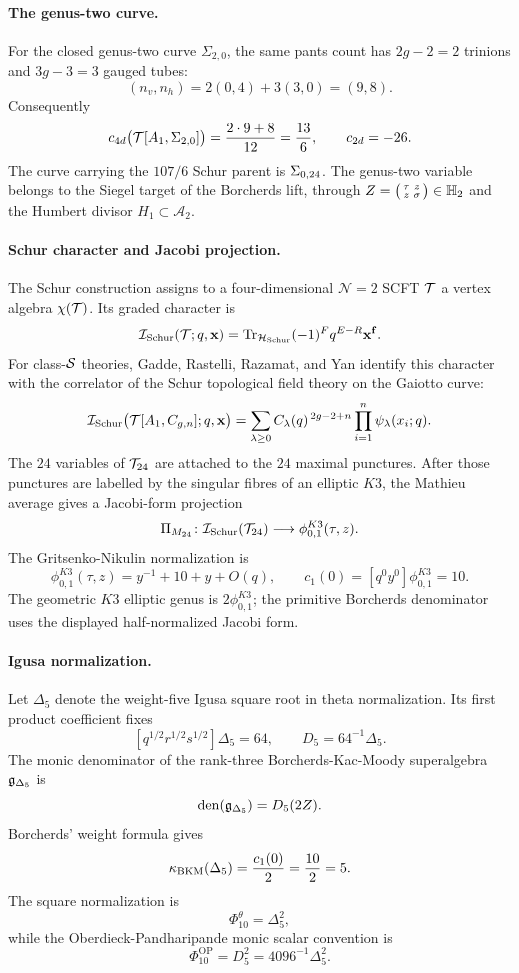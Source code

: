 \paragraph{The genus-two curve.}
For the closed genus-two curve \(\Sigma_{2,0}\), the same pants count
has \(2g-2=2\) trinions and \(3g-3=3\) gauged tubes:
\[
  (n_v,n_h)=2(0,4)+3(3,0)=(9,8).
\]
Consequently
\[
  c_{4d}\bigl(\mathcal{T}[A_1,\Sigma_{2,0}]\bigr)=\frac{2\cdot9+8}{12}
  =\frac{13}{6},
  \qquad
  c_{2d}=-26.
\]
The curve carrying the \(107/6\) Schur parent is \(\Sigma_{0,24}\). The
genus-two variable belongs to the Siegel target of the Borcherds lift,
through \(Z=\bigl(\begin{smallmatrix}\tau&z\\z&\sigma\end{smallmatrix}\bigr)\in\mathbb{H}_2\)
and the Humbert divisor \(H_1\subset\mathcal A_2\).

\paragraph{Schur character and Jacobi projection.}
The Schur construction assigns to a four-dimensional \(\mathcal N=2\)
SCFT \(\mathcal{T}\) a vertex algebra \(\chi(\mathcal{T})\). Its graded character is
\[
  \mathcal{I}_{\mathrm{Schur}}(\mathcal{T};q,\mathbf{x})
  =
  \operatorname{Tr}_{\mathcal H_{\mathrm{Schur}}}
  (-1)^Fq^{E-R}\mathbf{x}^{\mathbf f}.
\]
For class-\(\mathcal{S}\) theories, Gadde, Rastelli, Razamat, and Yan identify
this character with the correlator of the Schur topological field
theory on the Gaiotto curve:
\[
  \mathcal{I}_{\mathrm{Schur}}\bigl(\mathcal{T}[A_1,C_{g,n}];q,\mathbf{x}\bigr)
  =
  \sum_{\lambda\geq0}
  C_{\lambda}(q)^{\,2g-2+n}
  \prod_{i=1}^{n}\psi_{\lambda}(x_i;q).
\]
The \(24\) variables of \(\mathcal{T}_{24}\) are attached to the \(24\) maximal
punctures. After those punctures are labelled by the singular fibres of
an elliptic \(K3\), the Mathieu average gives a Jacobi-form projection
\[
  \Pi_{M_{24}}\colon
  \mathcal{I}_{\mathrm{Schur}}(\mathcal{T}_{24})
  \longrightarrow
  \phi_{0,1}^{K3}(\tau,z).
\]
The Gritsenko-Nikulin normalization is
\[
  \phi_{0,1}^{K3}(\tau,z)=y^{-1}+10+y+O(q),
  \qquad
  c_1(0)=[q^0y^0]\phi_{0,1}^{K3}=10.
\]
The geometric \(K3\) elliptic genus is \(2\phi_{0,1}^{K3}\); the
primitive Borcherds denominator uses the displayed half-normalized
Jacobi form.

\paragraph{Igusa normalization.}
Let \(\Delta_5\) denote the weight-five Igusa square root in theta
normalization. Its first product coefficient fixes
\[
  [q^{1/2}r^{1/2}s^{1/2}]\Delta_5=64,
  \qquad
  D_5=64^{-1}\Delta_5.
\]
The monic denominator of the rank-three Borcherds-Kac-Moody
superalgebra \(\mathfrak{g}_{\Delta_5}\) is
\[
  \operatorname{den}(\mathfrak{g}_{\Delta_5})=D_5(2Z).
\]
Borcherds' weight formula gives
\[
  \kappa_{\mathrm{BKM}}(\Delta_5)=\frac{c_1(0)}{2}=\frac{10}{2}=5.
\]
The square normalization is
\[
  \Phi_{10}^{\theta}=\Delta_5^2,
\]
while the Oberdieck-Pandharipande monic scalar convention is
\[
  \Phi_{10}^{\mathrm{OP}}=D_5^2=4096^{-1}\Delta_5^2.
\]

